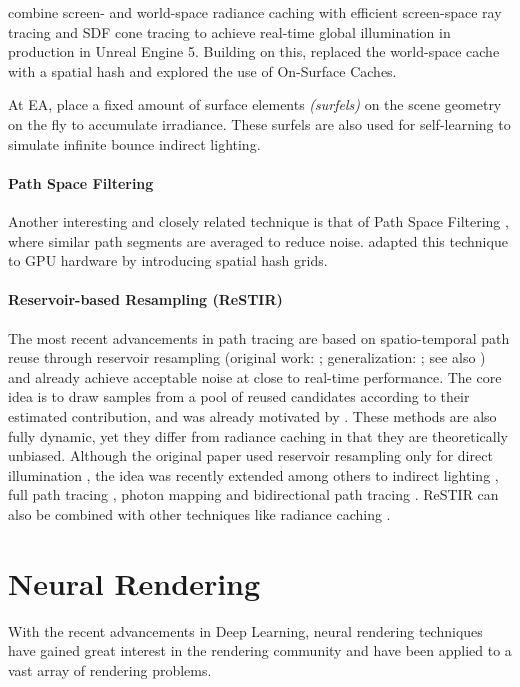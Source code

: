 \textcite{wright2021,wright2022} combine screen- and world-space radiance caching with efficient screen-space ray tracing and SDF cone tracing to achieve real-time global illumination in production in Unreal Engine 5.
Building on this, \textcite{boisse2023} replaced the world-space cache with a spatial hash and \textcite{tatzgern2024} explored the use of On-Surface Caches.

At EA, \textcite{stachowiak2018,halen2021,apers2024} place a fixed amount of surface elements \emph{(surfels)} on the scene geometry on the fly to accumulate irradiance.
These surfels are also used for self-learning to simulate infinite bounce indirect lighting.

\paragraph{Path Space Filtering}
Another interesting and closely related technique is that of Path Space Filtering \parencite{keller2016}, where similar path segments are averaged to reduce noise.
\textcite{binder2021} adapted this technique to GPU hardware by introducing spatial hash grids.

\paragraph{Reservoir-based Resampling (ReSTIR)}
The most recent advancements in path tracing are based on spatio-temporal path reuse through reservoir resampling (original work: \cite{bitterli2020}; generalization: \cite{lin2022}; see also \cite{wyman2023}) and already achieve acceptable noise at close to real-time performance.
The core idea is to draw samples from a pool of reused candidates according to their estimated contribution, and was already motivated by \textcite{talbot2005}.
These methods are also fully dynamic, yet they differ from radiance caching in that they are theoretically unbiased.
Although the original paper used reservoir resampling only for direct illumination \parencite{bitterli2020}, the idea was recently extended among others to indirect lighting \parencite{ouyang2021}, full path tracing \parencite{lin2022}, photon mapping \parencite{kern2024} and bidirectional path tracing \parencite{hedstrom2025}.
ReSTIR can also be combined with other techniques like radiance caching \parencite{muller2021,majercik2021,boisse2023}.

\section{Neural Rendering}
With the recent advancements in Deep Learning, neural rendering techniques have gained great interest in the rendering community and have been applied to a vast array of rendering problems.

